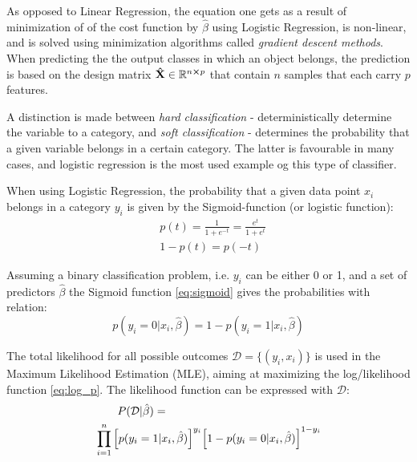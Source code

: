 As opposed to Linear Regression, the equation one gets as a result of minimization of of the cost function by $\hat{\beta}$ using Logistic Regression, is non-linear, and is solved using minimization algorithms called \emph{gradient descent methods}. \\

When predicting the the output classes in which an object belongs, the prediction is based on the design matrix $\mathbf{\hat{X}} \in \mathbb{R}^{n\cross p}$ that contain $n$ samples that each carry $p$ features.

A distinction is made between \textit{hard classification} - deterministically determine the variable to a category, and \textit{soft classification} - determines the probability that a given variable belongs in a certain category. The latter is favourable in many cases, and logistic regression is the most used example og this type of classifier.

When using Logistic Regression, the probability that a given data point $x_i$ belongs in a category $y_i$ is given by the Sigmoid-function (or logistic function):
\begin{equation}
\begin{split}
    & p(t) = \frac{1}{1 + e^{-t}} = \frac{e^t}{1+e^t} \\
    & 1-p(t) = p(-t)
\end{split}
  \label{eq:sigmoid}
\end{equation}

Assuming a binary classification problem, i.e. $y_i$ can be either 0 or 1, and a set of predictors $\hat{\beta}$ the Sigmoid function \eqref{eq:sigmoid} gives the probabilities with relation:
\begin{equation*}
  p(y_i = 0|x_i,\hat{\beta})  = 1 - p(y_i = 1|x_i,\hat{\beta})
  \label{eq:prob_relation}
\end{equation*}

The total likelihood for all possible outcomes $\mathcal{D}=\{(y_i,x_i)\}$ is used in the Maximum Likelihood Estimation (MLE), aiming at maximizing the log/likelihood function \eqref{eq:log_p}. The likelihood function can be expressed with $\mathcal{D}$:
\begin{equation*}
\begin{split}
    &\qquad P(\mathcal{D}|\hat{\beta}) = \\
    &\prod_{i=1}^n \qty[p(y_i = 1|x_i,\hat{\beta}) ]^{y_i}  \qty[1 - p(y_i = 0|x_i,\hat{\beta})]^{1-y_i}
\end{split}
\end{equation*}

